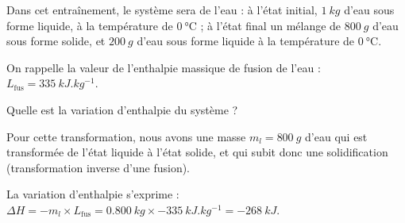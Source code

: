 
\begin{enonce}
Dans cet entraînement, le système sera de l'eau : à l'état initial, $\SI{1}{kg}$ d'eau sous forme liquide, à la température de $\SI{0}{\celsius}$ ; à l'état final un mélange de $\SI{800}{g}$ d'eau sous forme solide, et $\SI{200}{g}$ d'eau sous forme liquide à la température de $\SI{0}{\celsius}$. 

On rappelle la valeur de l'enthalpie massique de fusion de l'eau : $L_{\text{fus}}=\SI {335} {kJ.kg^{-1}}$.

Quelle est la variation d'enthalpie du système ?
\end{enonce}


\begin{corrige}
Pour cette transformation, nous avons une masse $m_l=\SI{800}{g}$ d'eau qui est transformée de l'état liquide à l'état solide, et qui subit donc une solidification (transformation inverse d'une fusion). 

La variation d'enthalpie s'exprime : $\Delta H= -m_l \times L_{\text{fus}} = \SI{0,800}{kg} \times \SI {-335} {kJ.kg^{-1}} =  \SI{-268} {kJ}$.
\end{corrige}



\finEntrainement


\minusBigskip





\minusSmallskip


